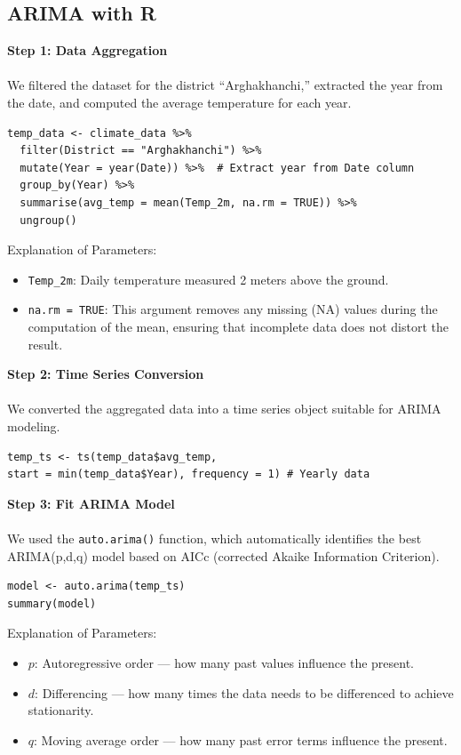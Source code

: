 \subsection*{ARIMA with R}

\textbf{Step 1: Data Aggregation}\\\\
We filtered the dataset for the district “Arghakhanchi,” extracted the year from the date, and computed the average temperature for each year.
\begin{verbatim}
temp_data <- climate_data %>% 
  filter(District == "Arghakhanchi") %>%
  mutate(Year = year(Date)) %>%  # Extract year from Date column
  group_by(Year) %>% 
  summarise(avg_temp = mean(Temp_2m, na.rm = TRUE)) %>%
  ungroup()
\end{verbatim}

Explanation of Parameters:
\begin{itemize}
    \item \texttt{Temp\_2m}: Daily temperature measured 2 meters above the ground.
    \item \texttt{na.rm = TRUE}: This argument removes any missing (NA) values during the computation of the mean, ensuring that incomplete data does not distort the result.
\end{itemize}

\textbf{Step 2: Time Series Conversion}\\\\ 
We converted the aggregated data into a time series object suitable for ARIMA modeling.
\begin{verbatim}
temp_ts <- ts(temp_data$avg_temp, 
start = min(temp_data$Year), frequency = 1) # Yearly data
\end{verbatim}

\textbf{Step 3: Fit ARIMA Model} \\ \\
We used the \texttt{auto.arima()} function, which automatically identifies the best ARIMA(p,d,q) model based on AICc (corrected Akaike Information Criterion).
\begin{verbatim}
model <- auto.arima(temp_ts)
summary(model)
\end{verbatim}

Explanation of Parameters:
\begin{itemize}
    \item \(p\): Autoregressive order — how many past values influence the present.
    \item \(d\): Differencing — how many times the data needs to be differenced to achieve stationarity.
    \item \(q\): Moving average order — how many past error terms influence the present.
\end{itemize}

